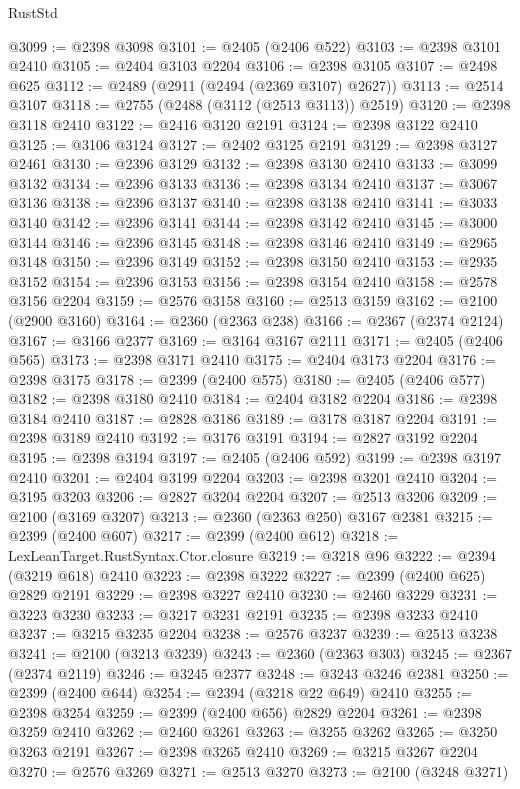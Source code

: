 \begin{lexlean}{RustStd}
\begin{coremodule}
@3099 := @2398 @3098
@3101 := @2405 (@2406 @522)
@3103 := @2398 @3101 @2410
@3105 := @2404 @3103 @2204
@3106 := @2398 @3105
@3107 := @2498 @625
@3112 := @2489 (@2911 (@2494 (@2369 @3107) @2627))
@3113 := @2514 @3107
@3118 := @2755 (@2488 (@3112 (@2513 @3113)) @2519)
@3120 := @2398 @3118 @2410
@3122 := @2416 @3120 @2191
@3124 := @2398 @3122 @2410
@3125 := @3106 @3124
@3127 := @2402 @3125 @2191
@3129 := @2398 @3127 @2461
@3130 := @2396 @3129
@3132 := @2398 @3130 @2410
@3133 := @3099 @3132
@3134 := @2396 @3133
@3136 := @2398 @3134 @2410
@3137 := @3067 @3136
@3138 := @2396 @3137
@3140 := @2398 @3138 @2410
@3141 := @3033 @3140
@3142 := @2396 @3141
@3144 := @2398 @3142 @2410
@3145 := @3000 @3144
@3146 := @2396 @3145
@3148 := @2398 @3146 @2410
@3149 := @2965 @3148
@3150 := @2396 @3149
@3152 := @2398 @3150 @2410
@3153 := @2935 @3152
@3154 := @2396 @3153
@3156 := @2398 @3154 @2410
@3158 := @2578 @3156 @2204
@3159 := @2576 @3158
@3160 := @2513 @3159
@3162 := @2100 (@2900 @3160)
@3164 := @2360 (@2363 @238)
@3166 := @2367 (@2374 @2124)
@3167 := @3166 @2377
@3169 := @3164 @3167 @2111
@3171 := @2405 (@2406 @565)
@3173 := @2398 @3171 @2410
@3175 := @2404 @3173 @2204
@3176 := @2398 @3175
@3178 := @2399 (@2400 @575)
@3180 := @2405 (@2406 @577)
@3182 := @2398 @3180 @2410
@3184 := @2404 @3182 @2204
@3186 := @2398 @3184 @2410
@3187 := @2828 @3186
@3189 := @3178 @3187 @2204
@3191 := @2398 @3189 @2410
@3192 := @3176 @3191
@3194 := @2827 @3192 @2204
@3195 := @2398 @3194
@3197 := @2405 (@2406 @592)
@3199 := @2398 @3197 @2410
@3201 := @2404 @3199 @2204
@3203 := @2398 @3201 @2410
@3204 := @3195 @3203
@3206 := @2827 @3204 @2204
@3207 := @2513 @3206
@3209 := @2100 (@3169 @3207)
@3213 := @2360 (@2363 @250) @3167 @2381
@3215 := @2399 (@2400 @607)
@3217 := @2399 (@2400 @612)
@3218 := LexLeanTarget.RustSyntax.Ctor.closure
@3219 := @3218 @96
@3222 := @2394 (@3219 @618) @2410
@3223 := @2398 @3222
@3227 := @2399 (@2400 @625) @2829 @2191
@3229 := @2398 @3227 @2410
@3230 := @2460 @3229
@3231 := @3223 @3230
@3233 := @3217 @3231 @2191
@3235 := @2398 @3233 @2410
@3237 := @3215 @3235 @2204
@3238 := @2576 @3237
@3239 := @2513 @3238
@3241 := @2100 (@3213 @3239)
@3243 := @2360 (@2363 @303)
@3245 := @2367 (@2374 @2119)
@3246 := @3245 @2377
@3248 := @3243 @3246 @2381
@3250 := @2399 (@2400 @644)
@3254 := @2394 (@3218 @22 @649) @2410
@3255 := @2398 @3254
@3259 := @2399 (@2400 @656) @2829 @2204
@3261 := @2398 @3259 @2410
@3262 := @2460 @3261
@3263 := @3255 @3262
@3265 := @3250 @3263 @2191
@3267 := @2398 @3265 @2410
@3269 := @3215 @3267 @2204
@3270 := @2576 @3269
@3271 := @2513 @3270
@3273 := @2100 (@3248 @3271)

\end{coremodule}
\end{lexlean}
